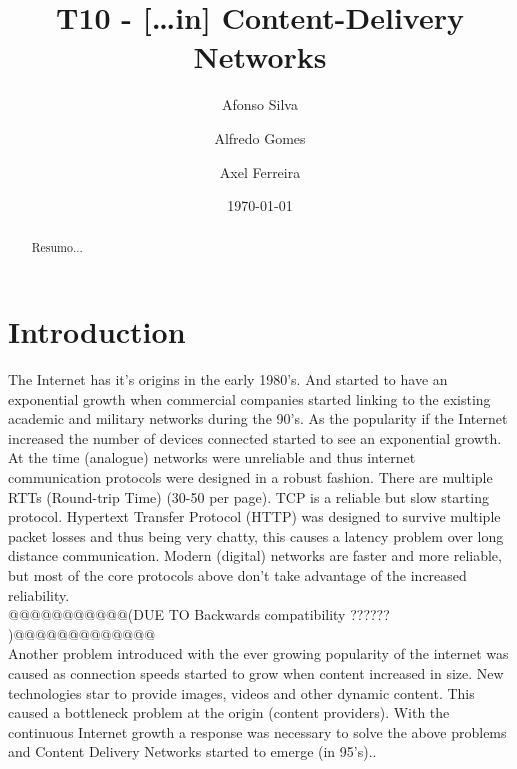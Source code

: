 \documentclass{llncs}
\begin{document}
\mainmatter
\title{T10 - [\dots in] Content-Delivery Networks}


\author{Afonso Silva\and Alfredo Gomes \and Axel Ferreira}



\date{\today}


\maketitle

\tableofcontents
\begin{abstract}
Resumo...
\end{abstract}
\section{Introduction}
The  Internet has it's origins in the early 1980's. And started to have an exponential growth when commercial companies started linking to the existing academic and military networks during the 90's. As the popularity if the Internet increased the number of devices connected started to see an exponential growth.\\
At the time (analogue) networks were unreliable and thus internet communication protocols were designed in a robust fashion. There are multiple RTTs (Round-trip Time) (30-50 per page). TCP is a reliable but slow starting protocol. Hypertext Transfer Protocol (HTTP) was designed to survive multiple packet losses and thus being very chatty, this causes a latency problem over long distance communication.
Modern (digital) networks are faster and more reliable, but most of the core protocols above don't take advantage of the increased reliability.\\ @@@@@@@@@@@(DUE TO Backwards compatibility ?????? )@@@@@@@@@@@@@\\
Another problem introduced with the ever growing popularity of the internet was caused as connection speeds started to grow when content increased in size. New technologies star to provide images, videos and other dynamic content. This caused a bottleneck problem at the origin (content providers).
With the continuous Internet growth a response was necessary to solve the above problems and Content Delivery Networks started to emerge (in 95's)..
\end{document}
